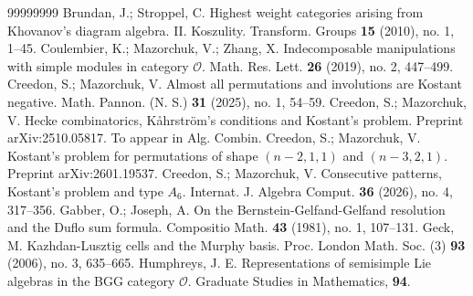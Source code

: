\documentclass[a4paper]{amsart}
\begin{document}
\begin{thebibliography}{99999999}
Brundan, J.; Stroppel, C.
Highest weight categories arising from Khovanov's diagram algebra. II. Koszulity.
Transform. Groups {\bf 15} (2010), no. 1, 1--45.
 Coulembier, K.; Mazorchuk, V.; Zhang, X. Indecomposable 
manipulations with simple modules in category $\mathcal{O}$. Math. Res. Lett. 
{\bf 26} (2019), no. 2, 447--499.
Creedon, S.; Mazorchuk, V.
Almost all permutations and involutions are Kostant negative.
Math. Pannon. (N. S.) {\bf 31} (2025), no. 1, 54--59.
Creedon, S.; Mazorchuk, V.
Hecke combinatorics, K{\aa}hrstr{\"o}m's conditions and Kostant's problem.
Preprint arXiv:2510.05817. To appear in Alg. Combin.
Creedon, S.; Mazorchuk, V.
Kostant's problem for permutations of shape $(n-2,1,1)$ and 
$(n-3,2,1)$. Preprint arXiv:2601.19537.
Creedon, S.; Mazorchuk, V.
Consecutive patterns, Kostant's problem and type $A_6$.
Internat. J. Algebra Comput. {\bf 36} (2026), no. 4, 317--356.
 Gabber, O.; Joseph, A. On the Bernstein-Gelfand-Gelfand 
resolution and the Duflo sum formula. Compositio Math. {\bf 43} (1981), 
no. 1, 107--131. 
Geck, M.
Kazhdan-Lusztig cells and the Murphy basis.
Proc. London Math. Soc. (3) {\bf 93} (2006), no. 3, 635--665.
 Humphreys, J. E. Representations of semisimple Lie algebras in 
the BGG category $\mathcal{O}$. Graduate Studies in Mathematics, {\bf 94}. 

\end{thebibliography}
\end{document}
